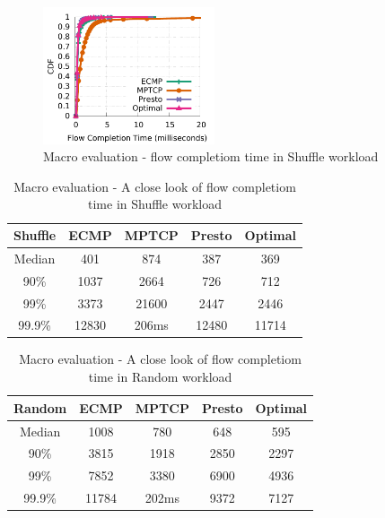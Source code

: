 \begin{figure}[!t]
        \centering
  \includegraphics[width=0.45\textwidth]{./figures/macro/shuffle/macro_compare_fct_shuffle_mice.pdf}
        \caption{Macro evaluation - flow completiom time in Shuffle workload}
        \label{macro_evaluation_fct_shuffle}
\end{figure}

\fi

\iffalse
\begin{table}[!htb]
\begin{center}
\begin{tabular}{ |c|c|c|c|c| } 
 \hline
 Shuffle & ECMP & MPTCP & Presto & Optimal \\
 \hline 
 Median & 401 & 874 & 387 & 369  \\ 
 90\%   & 1037 & 2664 & 726 & 712 \\
 99\%   & 3373 & 21600  & 2447 & 2446 \\ 
 99.9\% & 12830 & 206ms & 12480 & 11714 \\
 \hline

\end{tabular}
\caption{Macro evaluation - A close look of flow completiom time in Shuffle workload}
        \label{macro_evaluation_fct_shuffle_closelook}
\end{center}
\end{table}

\begin{table}[!htb]
\begin{center}
\begin{tabular}{ |c|c|c|c|c| }
 \hline
 Random & ECMP & MPTCP & Presto & Optimal \\
 \hline
 Median & 1008 & 780 & 648 & 595  \\
 90\%   & 3815 & 1918 & 2850 & 2297 \\
 99\%   & 7852 & 3380  & 6900 & 4936 \\
 99.9\% & 11784 & 202ms & 9372 & 7127 \\
 \hline

\end{tabular}
\caption{Macro evaluation - A close look of flow completiom time in Random workload}
        \label{macro_evaluation_fct_random_closelook}
\end{center}
\end{table}

